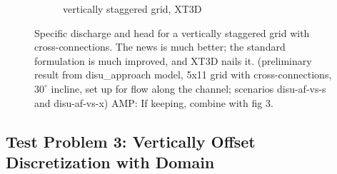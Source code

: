 \documentclass{article}
\begin{document}
\begin{figure}[H]
\begin{subfigure}{0.4\textwidth}
	\caption{vertically staggered grid, XT3D}
	\label{fig:disu-x-cc-head}
\end{subfigure}
\caption{Specific discharge and head for a vertically staggered grid with cross-connections. The news is much better; the standard formulation is much improved, and XT3D nails it. (preliminary result from disu\_approach model, 5x11 grid with cross-connections, $30^{\circ}$ incline, set up for flow along the channel; scenarios disu-af-vs-s and disu-af-vs-x)  {\color{red} AMP: If keeping, combine with fig 3.}}
\label{fig:figures}
\end{figure}

\subsection{Test Problem 3: Vertically Offset Discretization with Domain}
\end{document}
